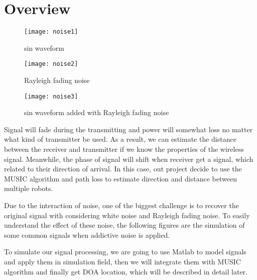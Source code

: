 
\section{Overview}
\label{sec:overview}
	
	\begin{figure}[ht]
	\centering
	\texttt{[image: noise1]}
	\caption{sin waveform}
	\end{figure}
	
	\begin{figure}[ht]
	\centering
	\texttt{[image: noise2]}
	\caption{Rayleigh fading noise}
	\end{figure}

	\begin{figure}[ht]
	\centering
	\texttt{[image: noise3]}
	\caption{sin waveform added with Rayleigh fading noise}
	\end{figure}
	
	Signal will fade during the transmitting and power will somewhat loss no matter what kind of transmitter be used. As a result, we can estimate the distance between the receiver and transmitter if we know the properties of the wireless signal. Meanwhile, the phase of signal will shift when receiver get a signal, which related to their direction of arrival. In this case, out project decide to use the MUSIC algorithm and path loss to estimate direction and distance between multiple robots.\\
	\par
	Due to the interaction of noise, one of the biggest challenge is to recover the original signal with considering white noise and Rayleigh fading noise. To easily understand the effect of these noise, the following figures are the simulation of some common signals when addictive noise is applied.\\

	
	\par
	To simulate our signal processing, we are going to use Matlab to model signals and apply them in simulation field, then we will integrate them with MUSIC algorithm and finally get DOA location, which will be described in detail later. 


